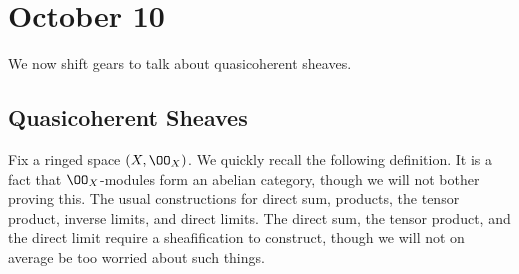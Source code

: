 \documentclass[../notes.tex]{subfiles}
\begin{document}
\section{October 10}

We now shift gears to talk about quasicoherent sheaves.

\subsection{Quasicoherent Sheaves}
Fix a ringed space $(X,\OO_X)$. We quickly recall the following definition.
\oxmoduledef*
\noindent It is a fact that $\OO_X$-modules form an abelian category, though we will not bother proving this. The usual constructions for direct sum, products, the tensor product, inverse limits, and direct limits. The direct sum, the tensor product, and the direct limit require a sheafification to construct, though we will not on average be too worried about such things.
\end{document}

